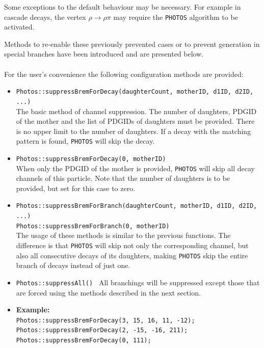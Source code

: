 \documentclass[]{Photos_interface_design}
\begin{document}
Some exceptions to the default behaviour may be necessary. For example
in cascade decays, the vertex $\rho \to \rho \pi$ may require the
{\tt PHOTOS} algorithm to be activated.

Methods to re-enable these previously prevented cases or to prevent generation in special
branches have been introduced and are presented below. \\ \\ 


For the user's convenience the following configuration methods are provided:
\begin{itemize}
 \item {\tt Photos::suppressBremForDecay(daughterCount, motherID, d1ID, d2ID, ...)} \hfill \\
       The basic method of channel suppression. The number of daughters,
	   PDGID of the mother and the list of PDGIDs of daughters must be provided.
	   There is no upper limit to the number of daughters.
	   If a decay with the matching pattern is found, {\tt PHOTOS} will skip the decay.
 \item {\tt Photos::suppressBremForDecay(0, motherID)} \hfill \\
       When only the PDGID of the mother is provided, {\tt PHOTOS} will skip all decay channels
	   of this particle. Note that the number of daughters is to be provided,
	   but  set for  this case to zero.
 \item {\tt Photos::suppressBremForBranch(daughterCount, motherID, d1ID, d2ID, ...)} \hfill \\
       {\tt Photos::suppressBremForBranch(0, motherID)} \hfill \\
       The usage of these methods is similar to the previous functions. The difference is
	   that {\tt PHOTOS} will skip not only the corresponding channel,
	   but also all consecutive decays of its daughters, making {\tt PHOTOS} skip the entire branch
	   of decays instead of just one.
 \item {\tt Photos::suppressAll() }
       All branchings will be suppressed except those that are forced using the methods
	   described in the next section.
 \item \textbf{Example:} \hfill \\
{\tt Photos::suppressBremForDecay(3, 15, 16, 11, -12); } \\
{\tt Photos::suppressBremForDecay(2, -15, -16, 211); } \\
{\tt Photos::suppressBremForDecay(0, 111); } \\

\end{itemize}
\end{document}
